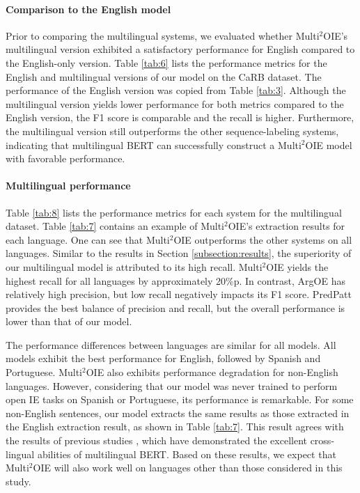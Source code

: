 \documentclass[11pt,a4paper]{article}
\begin{document}
\paragraph{Comparison to the English model}
Prior to comparing the multilingual systems, we evaluated whether Multi$^2$OIE's multilingual version exhibited a satisfactory performance for English compared to the English-only version.
Table \ref{tab:6} lists the performance metrics for the English and multilingual versions of our model on the CaRB dataset.
The performance of the English version was copied from Table \ref{tab:3}.
Although the multilingual version yields lower performance for both metrics compared to the English version, the F1 score is comparable and the recall is higher.
Furthermore, the multilingual version still outperforms the other sequence-labeling systems, indicating that multilingual BERT can successfully construct a Multi$^2$OIE model with favorable performance.

\paragraph{Multilingual performance}
Table \ref{tab:8} lists the performance metrics for each system for the multilingual dataset.
Table \ref{tab:7} contains an example of Multi$^2$OIE's extraction results for each language.
One can see that Multi$^2$OIE outperforms the other systems on all languages.
Similar to the results in Section \ref{subsection:results}, the superiority of our multilingual model is attributed to its high recall.
Multi$^2$OIE yields the highest recall for all languages by approximately 20\%p.
In contrast, ArgOE has relatively high precision, but low recall negatively impacts its F1 score.
PredPatt provides the best balance of precision and recall, but the overall performance is lower than that of our model.

The performance differences between languages are similar for all models.
All models exhibit the best performance for English, followed by Spanish and Portuguese.
Multi$^2$OIE also exhibits performance degradation for non-English languages.
However, considering that our model was never trained to perform open IE tasks on Spanish or Portuguese, its performance is remarkable.
For some non-English sentences, our model extracts the same results as those extracted in the English extraction result, as shown in Table \ref{tab:7}.
This result agrees with the results of previous studies \citep{pires-etal-2019-multilingual,wu-dredze-2019-beto,Karthikeyan2020CrossLingualAO}, which have demonstrated the excellent cross-lingual abilities of multilingual BERT.
Based on these results, we expect that Multi$^2$OIE will also work well on languages other than those considered in this study.
\end{document}
